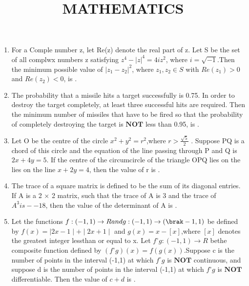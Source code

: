 \documentclass{article}
\begin{document}
\title{\centerline{\textbf{MATHEMATICS}}}
\maketitle{}
\author{}
\date{}

\begin{enumerate}

\item For a Comple number z, let Re(z) denote the real part of z. Let S be the set of all complwx numbers z satisfying $z^4 - |z|^4 = 4iz^2$, where $i = \sqrt{-1}$.Then the minimum possible value of $|z_1 - z_2|^2$, where $z_1,z_2 \in S$ with $Re(z_1)>0$ and $ Re(z_2)<0 $, is \underline{\hspace{2cm}}.

\item The probability that a missile hits a target successfully is 0.75. In order to destroy the target 
completely, at least three successful hits are required. Then the minimum number of missiles that
have to be fired so that the probability of completely destroying the target is $\textbf{NOT}$ less than 0.95, is \underline{\hspace{2cm}}.

\item Let O be the centre of the circle $x^2 + y^2 = r^2$,where $r>\frac{\sqrt{5}}{2}$
. Suppose PQ is a chord of this circle and the equation of the line passing through P and Q is $2x + 4y = 5$. If the centre of the circumcircle of the triangle OPQ lies on the lies on the line $x + 2y = 4$, then the value of r is \underline{\hspace{2cm}}.

\item The trace of a square matrix is defined to be the sum of its diagonal entries. If A is a 2 $\times$ 2 matrix, such that the trace of A is 3 and the trace of $A^3 is --18$, then the value of the determinant of A is \underline{\hspace{2cm}}.

\item Let the functions $f : (-1,1) \to R and g : (-1,1) \to (\brak-1,1)$ be defined by
 $f(x) = \mid2x - 1\mid + \mid2x + 1\mid$ and $g(x) = x - [x]$,where $[x]$ denotes the greatest integer lessthan or equal to x. Let $f ^\circ g: (-1,1) \to R$ bethe composite function defined by $(f ^\circ g)(x) = f(g(x))$.Suppose c is the number of points in the interval (-1,1) at which $f ^\circ g$ is $\textbf {NOT}$ continuous, and suppose d is the number of points in the interval (-1,1) at which $f ^\circ g$ is $\textbf{NOT}$ differentiable. Then the value of $c + d$ is \underline{\hspace{2cm}}.


\end{enumerate}
\end{document}

